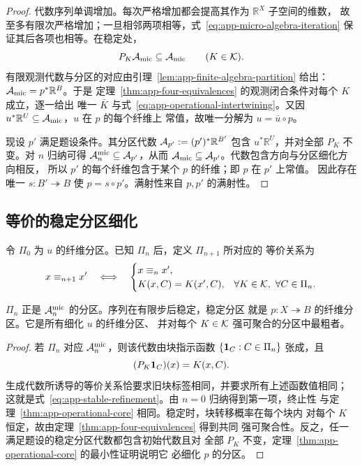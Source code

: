 \begin{proof}
代数序列单调增加。每次严格增加都会提高其作为 $\mathbb R^X$ 子空间的维数，
故至多有限次严格增加；一旦相邻两项相等，式~\eqref{eq:app-micro-algebra-iteration}
保证其后各项也相等。在稳定处，
\[
  P_K\mathcal A_{\mathrm{mic}}\subseteq\mathcal A_{\mathrm{mic}}
  \qquad(K\in\mathcal K).
\]
有限观测代数与分区的对应由引理~\ref{lem:app-finite-algebra-partition} 给出：
$\mathcal A_{\mathrm{mic}}=p^*\mathbb R^B$。于是
定理~\ref{thm:app-four-equivalences} 的观测闭合条件对每个 $K$ 成立，逐一给出
唯一 $\bar K$ 与式~\eqref{eq:app-operational-intertwining}。又因
$u^*\mathbb R^U\subseteq\mathcal A_{\mathrm{mic}}$，$u$ 在 $p$ 的每个纤维上
常值，故唯一分解为 $u=\bar u\circ p$。

现设 $p'$ 满足题设条件。其分区代数
$\mathcal A_{p'}:=(p')^*\mathbb R^{B'}$ 包含 $u^*\mathbb R^U$，并对全部
$P_K$ 不变。对 $n$ 归纳可得
$\mathcal A^{\mathrm{mic}}_n\subseteq\mathcal A_{p'}$，从而
$\mathcal A_{\mathrm{mic}}\subseteq\mathcal A_{p'}$。代数包含方向与分区细化方向相反，
所以 $p'$ 的每个纤维包含于某个 $p$ 的纤维；即 $p$ 在 $p'$ 上常值。
因此存在唯一 $s:B'\twoheadrightarrow B$ 使 $p=s\circ p'$。满射性来自
$p,p'$ 的满射性。
\end{proof}

\subsection{等价的稳定分区细化}

令 $\Pi_0$ 为 $u$ 的纤维分区。已知 $\Pi_n$ 后，定义 $\Pi_{n+1}$ 所对应的
等价关系为
\begin{equation}
 x\equiv_{n+1}x'
 \quad\Longleftrightarrow\quad
 \begin{cases}
   x\equiv_nx',\\
   K(x,C)=K(x',C),&
   \forall K\in\mathcal K,\ \forall C\in\Pi_n.
 \end{cases}
 \label{eq:app-stable-refinement}
\end{equation}

\begin{proposition}[稳定分区算法]
\label{prop:app-stable-refinement}
$\Pi_n$ 正是 $\mathcal A_n^{\mathrm{mic}}$ 的分区。序列在有限步后稳定，稳定分区
就是 $p:X\twoheadrightarrow B$ 的纤维分区。它是所有细化 $u$ 的纤维分区、
并对每个 $K\in\mathcal K$ 强可聚合的分区中最粗者。
\end{proposition}

\begin{proof}
若 $\Pi_n$ 对应 $\mathcal A_n^{\mathrm{mic}}$，则该代数由块指示函数
$\{\mathbf 1_C:C\in\Pi_n\}$ 张成，且
\[
  (P_K\mathbf 1_C)(x)=K(x,C).
\]
生成代数所诱导的等价关系恰要求旧块标签相同，并要求所有上述函数值相同；
这就是式~\eqref{eq:app-stable-refinement}。由 $n=0$ 归纳得到第一项，终止性
与定理~\ref{thm:app-operational-core} 相同。稳定时，块转移概率在每个块内
对每个 $K$ 恒定，故由定理~\ref{thm:app-four-equivalences} 得到共同
强可聚合性。反之，任一满足题设的稳定分区代数都包含初始代数且对
全部 $P_K$ 不变，定理~\ref{thm:app-operational-core} 的最小性证明说明它
必细化 $p$ 的分区。
\end{proof}

